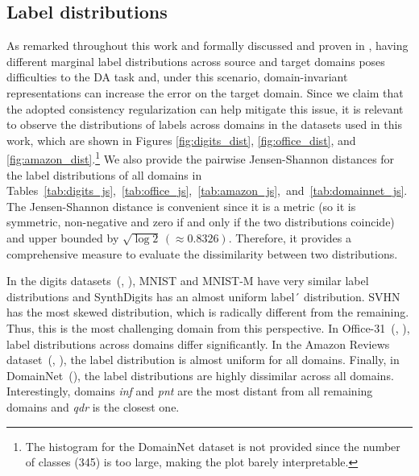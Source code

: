 \subsection{Label distributions}
\label{sec:label_dist}
As remarked throughout this work and formally discussed and proven in \cite{Zhao2019}, having different marginal label distributions across source and target domains poses difficulties to the DA task and, under this scenario, domain-invariant representations can increase the error on the target domain. Since we claim that the adopted consistency regularization can help mitigate this issue, it is relevant to observe the distributions of labels across domains in the datasets used in this work, which are shown in Figures \ref{fig:digits_dist}, \ref{fig:office_dist}, and \ref{fig:amazon_dist}.\footnote{The histogram for the DomainNet dataset is not provided since the number of classes (345) is too large, making the plot barely interpretable.} We also provide the pairwise Jensen-Shannon distances for the label distributions of all domains in Tables~\ref{tab:digits_js},~\ref{tab:office_js},~\ref{tab:amazon_js},~and~\ref{tab:domainnet_js}. The Jensen-Shannon distance is convenient since it is a metric (so it is symmetric, non-negative and zero if and only if the two distributions coincide) and upper bounded by $\sqrt{\log 2}\,(\approx 0.8326)$. Therefore, it provides a comprehensive measure to evaluate the dissimilarity between two distributions.

In the digits datasets~(, ), MNIST and MNIST-M have very similar label distributions and SynthDigits has an almost uniform label´ distribution. SVHN has the most skewed distribution, which is radically different from the remaining. Thus, this is the most challenging domain from this perspective. In Office-31~(, ), label distributions across domains differ significantly. In the Amazon Reviews dataset~(, ), the label distribution is almost uniform for all domains. Finally, in DomainNet~(), the label distributions are highly dissimilar across all domains. Interestingly, domains \textit{inf} and \textit{pnt} are the most distant from all remaining domains and \textit{qdr} is the closest one.

